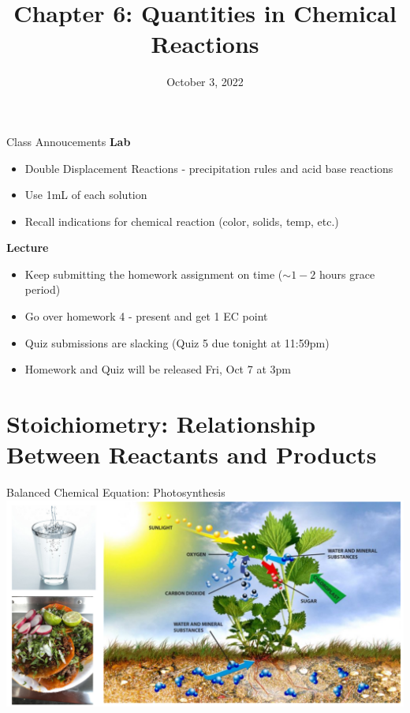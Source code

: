 \documentclass[11pt]{beamer}
\title{Chapter 6: Quantities in Chemical Reactions}
\institute{Chemistry Department, Cypress College}
\date{October 3, 2022}
\begin{document}
\begin{frame}
  \titlepage
\end{frame}

\begin{frame}{Class Annoucements}
  \textbf{Lab}
  \begin{itemize}
  \item Double Displacement Reactions - precipitation rules
    and acid base reactions
  \item Use 1mL of each solution
  \item Recall indications for chemical reaction (color, solids,
    temp, etc.)
  \end{itemize}
  
  \textbf{Lecture}
  \begin{itemize}
  \item Keep submitting the homework assignment on time
    ($\sim 1-2$ hours grace period)
  \item Go over homework 4 - present and get 1 EC point
  \item Quiz submissions are slacking (Quiz 5 due tonight
    at 11:59pm)
  \item Homework and Quiz will be released Fri, Oct 7 at 3pm
  \end{itemize}
\end{frame}

\section{Stoichiometry: Relationship Between Reactants and Products}

\begin{frame}{Balanced Chemical Equation: Photosynthesis}
  \centering
  \includegraphics[trim={8in 0 0 0},clip,width=1\linewidth]{food_pic}
\end{frame}
\end{document}
